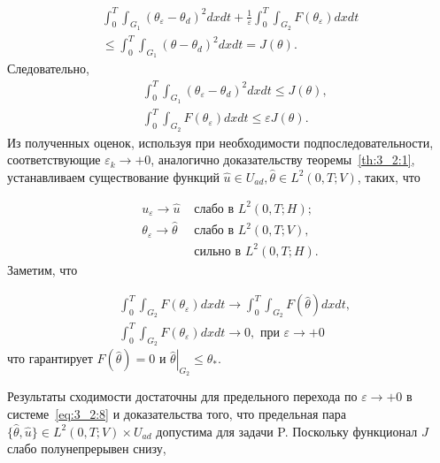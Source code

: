 \[
    \begin{array}{r}
        \int_{0}^{T} \int_{G_{1}}\left(\theta_{\varepsilon}
        -\theta_{d}\right)^{2} d x d t+\frac{1}{\varepsilon}
        \int_{0}^{T} \int_{G_{2}}
        F\left(\theta_{\varepsilon}\right) d x d t \\
        \leq \int_{0}^{T} \int_{G_{1}}
        \left(\theta-\theta_{d}\right)^{2} d x d t=J(\theta).
    \end{array}
\]
Следовательно,
\[
    \begin{aligned}
        &\int_{0}^{T} \int_{G_{1}}\left(\theta_{\varepsilon}
        -\theta_{d}\right)^{2} d x d t \leq J(\theta), \\
        &\int_{0}^{T} \int_{G_{2}} F
        \left(\theta_{\varepsilon}\right) d x d t \leq \varepsilon J(\theta).
    \end{aligned}
\]
Из полученных оценок, используя при необходимости подпоследовательности,
соответствующие $\varepsilon_{k} \rightarrow+0$,
аналогично доказательству теоремы~\ref{th:3_2:1}, устанавливаем существование
функций $\widehat{u} \in U_{a d}, \widehat{\theta} \in L^{2}(0, T ; V)$, таких, что

\[
    \begin{aligned}
        u_{\varepsilon}  \rightarrow \widehat{u} & \text { слабо в } L^{2}(0, T ; H); \\
        \theta_{\varepsilon}  \rightarrow \widehat{\theta} & \text { слабо в } L^{2}(0, T ; V), \\
        & \text { сильно в } L^{2}(0, T; H).
    \end{aligned}
\]
Заметим, что

\[
    \begin{aligned}
        &\int_{0}^{T} \int_{G_{2}} F\left(\theta_{\varepsilon}\right) d x d t
        \rightarrow \int_{0}^{T} \int_{G_{2}} F(\widehat{\theta}) d x d t, \\
        &\int_{0}^{T} \int_{G_{2}} F\left(\theta_{\varepsilon}\right) d x d t
        \rightarrow 0, \text { при } \varepsilon \rightarrow+0
    \end{aligned}
\]
что гарантирует $F(\widehat{\theta})=0$ и
$\left.\widehat{\theta}\right|_{G_{2}} \leq \theta_{*}$.

Результаты сходимости достаточны для предельного
перехода по $\varepsilon \rightarrow+0$ в системе~\eqref{eq:3_2:8}
и доказательства того, что предельная пара
$\{\widehat{\theta}, \widehat{u}\} \in L ^{2}(0, T ; V) \times U_{a d}$
допустима для задачи P\@.
Поскольку функционал $J$ слабо полунепрерывен снизу,

